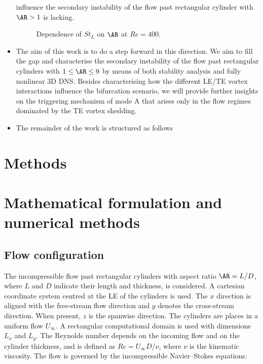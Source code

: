 \documentclass[onecolumn,notitlepage,superscriptaddress, amsmath,amssymb,longbibliographyaps,floatfix]{revtex4-1}
\begin{document}
\begin{itemize}
influence the secondary instability of the flow past rectangular cylinder with $\AR>1$ is lacking.
  
\begin{figure}
  \centering
   
   \caption{Dependence of $St_L$ on $\AR$ at $Re=400$.}
   \label{fig:StLAR}
\end{figure}
  
  \item The aim of this work is to do a step forward in this direction. We aim to fill the gap and characterise the secondary instability of the flow past rectangular cylinders with $1 \le \AR \le 9$ by means of both stability analysis and fully nonlinear 3D DNS. Besides characterising how the different LE/TE vortex interactions influence the bifurcation scenario, we will provide further insights on the triggering mechanism of mode A that arises only in the flow regimes dominated by the TE vortex shedding. 
  
\item The remainder of the work is structured as follows
  


\end{itemize}

\section{Methods}

\section{Mathematical formulation and numerical methods}\label{sec:methods}

\subsection{Flow configuration}
The incompressible flow past rectangular cylinders with aspect ratio $\AR=L/D$, where $L$ and $D$ indicate their length and thickness, is considered. A cartesian coordinate system centred at the LE of the cylinders is used. The $x$ direction is aligned with the free-stream flow direction and $y$ denotes the cross-stream direction. When present, $z$ is the spanwise direction. The cylinders are places in a uniform flow $U_\infty$. A rectangular computational domain is used with dimensions $L_x$ and $L_y$. The Reynolds number depends on the incoming flow and on the cylinder thickness, and is defined as $Re= U_\infty D /\nu$, where $\nu$ is the kinematic viscosity. The flow is governed by the incompressible Navier--Stokes equations:
%
\end{document}
